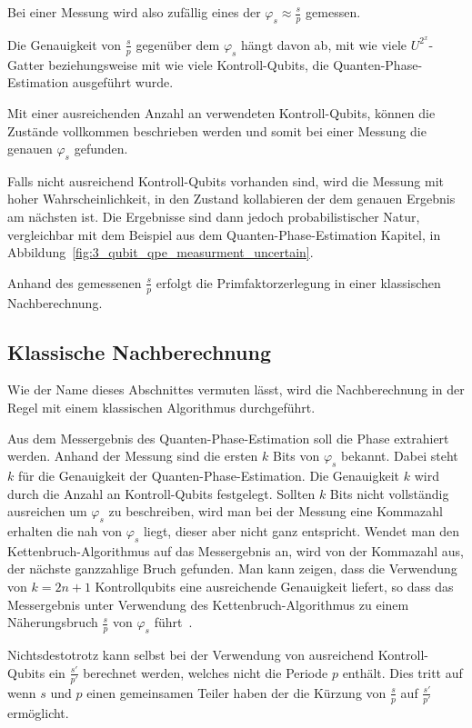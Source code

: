 Bei einer Messung wird also zufällig eines der \(\varphi_s \approx \frac{s}{p}\) gemessen.

Die Genauigkeit von \(\frac{s}{p}\) gegenüber dem \(\varphi_s\) hängt davon ab,
mit wie viele \(U^{2^x}\)-Gatter beziehungsweise mit wie viele Kontroll-Qubits,
die Quanten-Phase-Estimation ausgeführt wurde.

Mit einer ausreichenden Anzahl an verwendeten Kontroll-Qubits, 
können die Zustände vollkommen beschrieben werden und 
somit bei einer Messung die genauen \(\varphi_s\) gefunden.  

Falls nicht ausreichend Kontroll-Qubits vorhanden sind,
wird die Messung mit hoher Wahrscheinlichkeit, 
in den Zustand kollabieren der dem genauen Ergebnis am nächsten ist. 
Die Ergebnisse sind dann jedoch probabilistischer Natur, 
vergleichbar mit dem Beispiel aus dem Quanten-Phase-Estimation Kapitel, 
in Abbildung~\ref*{fig:3_qubit_qpe_measurment_uncertain}.

Anhand des gemessenen \(\frac{s}{p}\) erfolgt die Primfaktorzerlegung in einer klassischen Nachberechnung.

\subsection{Klassische Nachberechnung}
Wie der Name dieses Abschnittes vermuten lässt, 
wird die Nachberechnung in der Regel mit einem klassischen Algorithmus durchgeführt.

Aus dem Messergebnis des Quanten-Phase-Estimation soll die Phase extrahiert werden.
Anhand der Messung sind die ersten \(k\) Bits von \(\varphi_s\) bekannt.
Dabei steht \(k\) für die Genauigkeit der Quanten-Phase-Estimation.
Die Genauigkeit \(k\) wird durch die Anzahl an Kontroll-Qubits festgelegt.
Sollten \(k\) Bits nicht vollständig ausreichen um \(\varphi_s\)  zu beschreiben, 
wird man bei der Messung eine Kommazahl erhalten die nah von \(\varphi_s\) liegt,
dieser aber nicht ganz entspricht.
Wendet man den Kettenbruch-Algorithmus auf das Messergebnis an,
wird von der Kommazahl aus, der nächste ganzzahlige Bruch gefunden.
Man kann zeigen, dass die Verwendung von \(k = 2n+1\) Kontrollqubits eine ausreichende Genauigkeit liefert,
so dass das Messergebnis unter Verwendung des Kettenbruch-Algorithmus zu einem Näherungsbruch \(\frac{s}{p}\) von \(\varphi_s\) führt~\cite*{nielsen_chuang_2010}.

Nichtsdestotrotz kann selbst bei der Verwendung von ausreichend Kontroll-Qubits ein \(\frac{s'}{p'}\) berechnet werden,
welches nicht die Periode \(p\) enthält.
Dies tritt auf wenn \(s\) und \(p\) einen gemeinsamen Teiler haben der die Kürzung von \(\frac{s}{p}\) auf \(\frac{s'}{p'}\) ermöglicht.


